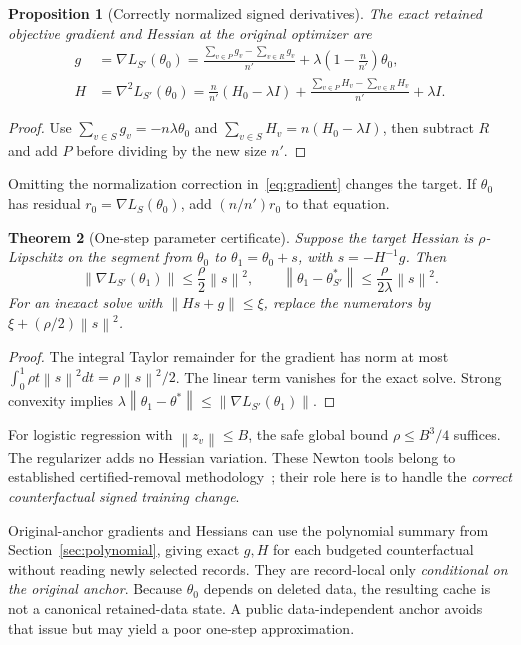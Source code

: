 \documentclass[11pt,a4paper]{article}
\newtheorem{theorem}{Theorem}[section]
\newtheorem{proposition}[theorem]{Proposition}
\theoremstyle{definition}\newtheorem{definition}[theorem]{Definition}
\newcommand{\norm}[1]{\left\lVert #1\right\rVert}
\begin{document}
\begin{proposition}[Correctly normalized signed derivatives]\label{prop:derivatives}
The exact retained objective gradient and Hessian at the original optimizer are
\begin{align}
 g&=\nabla L_{S'}(\theta_0)
 =\frac{\sum_{v\in P}g_v-\sum_{v\in R}g_v}{n'}
   +\lambda\left(1-\frac n{n'}\right)\theta_0,\label{eq:gradient}\\
 H&=\nabla^2L_{S'}(\theta_0)
 =\frac n{n'}(H_0-\lambda I)
 +\frac{\sum_{v\in P}H_v-\sum_{v\in R}H_v}{n'}+\lambda I.
 \label{eq:hessian}
\end{align}
\end{proposition}
\begin{proof}
Use $\sum_{v\in S}g_v=-n\lambda\theta_0$ and
$\sum_{v\in S}H_v=n(H_0-\lambda I)$, then subtract $R$ and add $P$ before dividing by the new size $n'$.
\end{proof}
Omitting the normalization correction in~\eqref{eq:gradient} changes the target. If $\theta_0$ has residual $r_0=\nabla L_S(\theta_0)$, add $(n/n')r_0$ to that equation.

\begin{theorem}[One-step parameter certificate]\label{thm:newton}
Suppose the target Hessian is $\rho$-Lipschitz on the segment from $\theta_0$ to $\theta_1=\theta_0+s$, with $s=-H^{-1}g$. Then
\begin{equation}
 \norm{\nabla L_{S'}(\theta_1)}\le\frac\rho2\norm{s}^2,
 \qquad
 \norm{\theta_1-\theta^*_{S'}}\le\frac\rho{2\lambda}\norm{s}^2.
\end{equation}
For an inexact solve with $\norm{Hs+g}\le\xi$, replace the numerators by $\xi+(\rho/2)\norm{s}^2$.
\end{theorem}
\begin{proof}
The integral Taylor remainder for the gradient has norm at most
$\int_0^1\rho t\norm{s}^2dt=\rho\norm{s}^2/2$. The linear term vanishes for the exact solve. Strong convexity implies
$\lambda\norm{\theta_1-\theta^*}\le\norm{\nabla L_{S'}(\theta_1)}$.
\end{proof}
For logistic regression with $\norm{z_v}\le B$, the safe global bound $\rho\le B^3/4$ suffices. The regularizer adds no Hessian variation. These Newton tools belong to established certified-removal methodology~\cite{guo2020}; their role here is to handle the \emph{correct counterfactual signed training change}.

Original-anchor gradients and Hessians can use the polynomial summary from Section~\ref{sec:polynomial}, giving exact $g,H$ for each budgeted counterfactual without reading newly selected records. They are record-local only \emph{conditional on the original anchor}. Because $\theta_0$ depends on deleted data, the resulting cache is not a canonical retained-data state. A public data-independent anchor avoids that issue but may yield a poor one-step approximation.
\end{document}
